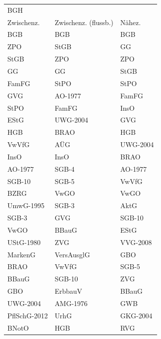 \begin{tabular}{lll}
\toprule
\multicolumn{4}{l}{BGH} \\
  Zwischenz. & Zwischenz. (flussb.) &   Nähez. \\
\midrule
         BGB &                  BGB &      BGB \\
         ZPO &                 StGB &       GG \\
        StGB &                  ZPO &      ZPO \\
          GG &                   GG &     StGB \\
       FamFG &                 StPO &     StPO \\
         GVG &              AO-1977 &    FamFG \\
        StPO &                FamFG &     InsO \\
        EStG &             UWG-2004 &      GVG \\
         HGB &                 BRAO &      HGB \\
       VwVfG &                  AÜG & UWG-2004 \\
        InsO &                 InsO &     BRAO \\
     AO-1977 &                SGB-4 &  AO-1977 \\
      SGB-10 &                SGB-5 &    VwVfG \\
        BZRG &                 VwGO &     VwGO \\
   UmwG-1995 &                SGB-3 &     AktG \\
       SGB-3 &                  GVG &   SGB-10 \\
        VwGO &                BBauG &     EStG \\
   UStG-1980 &                  ZVG & VVG-2008 \\
     MarkenG &           VersAusglG &      GBO \\
        BRAO &                VwVfG &    SGB-5 \\
       BBauG &               SGB-10 &      ZVG \\
         GBO &              ErbbauV &    BBauG \\
    UWG-2004 &             AMG-1976 &      GWB \\
PflSchG-2012 &                 UrhG & GKG-2004 \\
       BNotO &                  HGB &      RVG \\
\bottomrule
\end{tabular}

